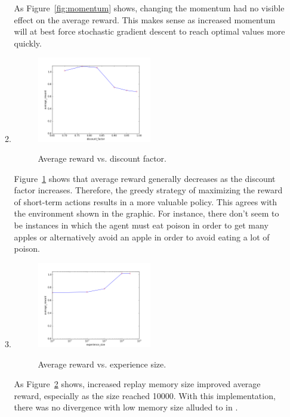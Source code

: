 \documentclass{article}
\newcommand*{\0}{\Vec{0}}
\begin{document}
\begin{enumerate}
\begin{enumerate}
				As Figure~\ref{fig:momentum} shows, changing the momentum had no visible effect on the average reward.
				This makes sense as increased momentum will at best force stochastic gradient descent to reach optimal values more quickly.
			\item
				\begin{figure}[H]
					\centering
					\caption{Average reward vs. discount factor.}
					\includegraphics[width=0.5\textwidth]{fig/discount_factor.png}
					\label{fig:discount_factor}
				\end{figure}
				Figure~\ref{fig:discount_factor} shows that average reward generally decreases as the discount factor increases.
				Therefore, the greedy strategy of maximizing the reward of short-term actions results in a more valuable policy.
				This agrees with the environment shown in the graphic.
				For instance, there don't seem to be instances in which the agent must eat poison in order to get many apples or alternatively avoid an apple in order to avoid eating a lot of poison.
			\item
				\begin{figure}[H]
					\centering
					\caption{Average reward vs. experience size.}
					\includegraphics[width=0.5\textwidth]{fig/experience_size.png}
					\label{fig:experience_size}
				\end{figure}
				As Figure~\ref{fig:experience_size} shows, increased replay memory size improved average reward, especially as the size reached 10000.
				With this implementation, there was no divergence with low memory size alluded to in \cite{deepmind}.
		\end{enumerate}
\end{enumerate}



\end{document}
